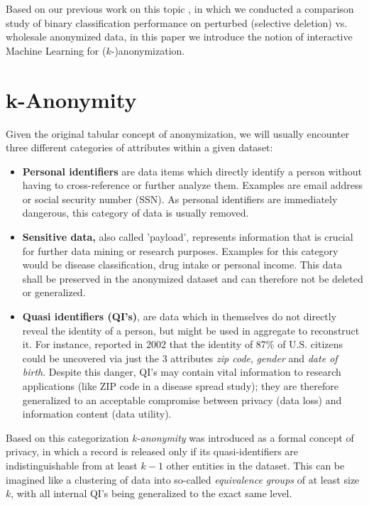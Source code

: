 \documentclass{llncs}
\begin{document}
Based on our previous work on this topic \cite{malle2016right}, in which we conducted a comparison study of binary classification performance on perturbed (selective deletion) vs. wholesale anonymized data, in this paper we introduce the notion of interactive Machine Learning for ($k$-)anonymization.



\section{k-Anonymity}
\label{sect:k_anon}

Given the original tabular concept of anonymization, we will usually encounter three different categories of attributes within a given dataset:

\begin{itemize}
	\item \textbf{Personal identifiers} are data items which directly identify a person without having to cross-reference or further analyze them. Examples are email address or social security number (SSN). As personal identifiers are immediately dangerous, this category of data is usually removed.
	\item \textbf{Sensitive data,} also called 'payload', represents information that is crucial for further data mining or research purposes. Examples for this category would be disease classification, drug intake or personal income. This data shall be preserved in the anonymized dataset and can therefore not be deleted or generalized.
	\item \textbf{Quasi identifiers (QI's)}, are data which in themselves do not directly reveal the identity of a person, but might be used in aggregate to reconstruct it. For instance, \cite{sweeney2002k} reported in 2002 that the identity of 87\% of U.S. citizens could be uncovered via just the 3 attributes \textit{zip code}, \textit{gender} and \textit{date of birth}. Despite this danger, QI's may contain vital information to research applications (like ZIP code in a disease spread study); they are therefore generalized to an acceptable compromise between privacy (data loss) and information content (data utility).
\end{itemize}

Based on this categorization \textit{k-anonymity} \cite{Samarati:2001:kAnonymity} was introduced as a formal concept of privacy, in which a record is released only if its quasi-identifiers are indistinguishable from at least $k-1$ other entities in the dataset. This can be imagined like a clustering of data into so-called \textit{equivalence groups} of at least size $k$, with all internal QI's being generalized to the exact same level.
\end{document}
